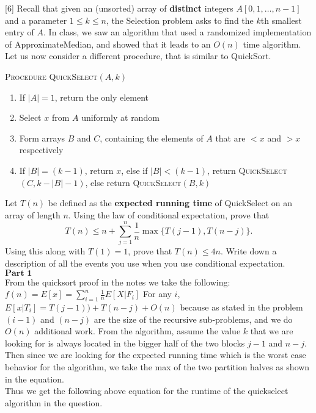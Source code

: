 \documentclass[addpoints, 11pt]{exam}
\begin{document}
\begin{questions}
  [6]
  Recall that given an (unsorted) array of {\bf distinct} integers $A[0, 1, \dots, n-1]$ and a parameter $1 \le k \le n$, the Selection problem asks to  find the $k$th smallest entry of $A$. In class, we saw an algorithm that used a randomized implementation of ApproximateMedian, and showed that it leads to an $O(n)$ time algorithm.  Let us now consider a different procedure, that is similar to QuickSort.

  \textsc{Procedure QuickSelect}$(A, k)$
  \begin{enumerate}
    \item If $|A|=1$, return the only element
    \item Select $x$ from $A$ uniformly at random
    \item Form arrays $B$ and $C$, containing the elements of $A$ that are $<x$ and $>x$ respectively
    \item If $|B| = (k-1)$, return $x$, else if $|B| < (k-1)$, return \textsc{QuickSelect}$(C, k-|B|-1)$, else return \textsc{QuickSelect}$(B, k)$
  \end{enumerate}

  Let $T(n)$ be defined as the {\bf expected running time} of QuickSelect on an array of length $n$. Using the law of conditional expectation, prove that
  \[ T(n) \le n + \sum_{j=1}^n \frac{1}{n} \max \{ T(j-1), T(n-j)\}. \]
  Using this along with $T(1) = 1$, prove that $T(n) \le 4n$.  Write down a description of all the events you use when you use conditional expectation. \\
  $\textbf{Part 1}$ \\
  From the quicksort proof in the notes we take the following: $f(n) = E[x] = \sum_{i = 1}^{n}\frac{1}{n}E[X | F_i]$
  For any $i$,$E[x | T_i] = T(j - 1)) + T(n - j) + O(n)$ because as stated in the problem $(i - 1)$ and $(n - j)$ are the size of the recursive sub-problems,
  and we do $O(n)$ additional work. From the algorithm, assume the value $k$ that we are looking for is always located in the bigger half of the two blocks $j - 1$ and $ n - j$.
  Then since we are looking for the expected running time which is the worst case behavior for the algorithm, we take the max of the two partition halves as shown in the equation. \\
  Thus we get the following above equation for the runtime of the quickselect algorithm in the question.


\end{questions}
\end{document}
